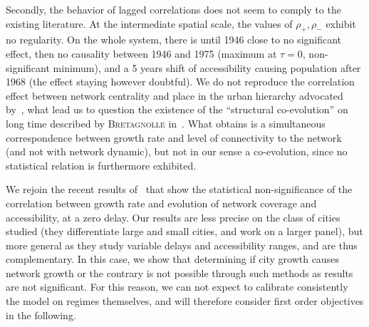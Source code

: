 \documentclass[11pt]{article}
\newcommand{\noun}[1]{\textsc{#1}}
\begin{document}
Secondly, the behavior of lagged correlations does not seem to comply to the existing literature. At the intermediate spatial scale, the values of $\rho_+,\rho_-$ exhibit no regularity. On the whole system, there is until 1946 close to no significant effect, then no causality between 1946 and 1975 (maximum at $\tau = 0$, non-significant minimum), and a 5 years shift of accessibility causing population after 1968 (the effect staying however doubtful). We do not reproduce the correlation effect between network centrality and place in the urban hierarchy advocated by~\cite{bretagnolle2003vitesse}, what lead us to question the existence of the ``structural co-evolution'' on long time described by \noun{Bretagnolle} in~\citep{espacegeo2014effets}. What \cite{bretagnolle2003vitesse} obtains is a simultaneous correspondence between growth rate and level of connectivity to the network (and not with network dynamic), but not in our sense a co-evolution, since no statistical relation is furthermore exhibited.


We rejoin the recent results of~\cite{mimeur:hal-01616746} that show the statistical non-significance of the correlation between growth rate and evolution of network coverage and accessibility, at a zero delay. Our results are less precise on the class of cities studied (they differentiate large and small cities, and work on a larger panel), but more general as they study variable delays and accessibility ranges, and are thus complementary. In this case, we show that determining if city growth causes network growth or the contrary is not possible through such methods as results are not significant. For this reason, we can not expect to calibrate consistently the model on regimes themselves, and will therefore consider first order objectives in the following.
\end{document}
